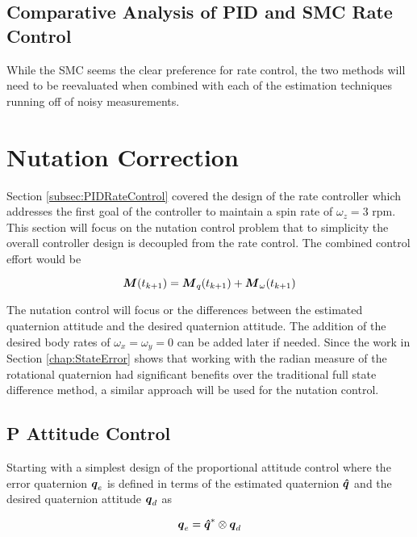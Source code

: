 \subsection{Comparative Analysis of PID and SMC Rate Control}
\label{subsec:ComparativeAnalysisofPIDandSMCRateControl}


While the SMC seems the clear preference for rate control, the two methods will need to be reevaluated when combined with each of the estimation techniques running off of noisy measurements.

\section{Nutation Correction}
\label{sec:NutationCorrection}

Section \ref{subsec:PIDRateControl} covered the design of the rate controller which addresses the first goal of the controller to maintain a spin rate of $\omega_z = 3$ rpm.  This section will focus on the nutation control problem that to simplicity the overall controller design is decoupled from the rate control.  The combined control effort would be

\begin{equation}
    \boldsymbol{M}(t_{k+1}) = \boldsymbol{M}_{q}(t_{k+1}) + \boldsymbol{M}_{\omega}(t_{k+1})
\end{equation}

The nutation control will focus or the differences between the estimated quaternion attitude and the desired quaternion attitude.  The addition of the desired body rates of $\omega_x = \omega_y = 0$ can be added later if needed.  Since the work in Section \ref{chap:StateError} shows that working with the radian measure of the rotational quaternion had significant benefits over the traditional full state difference method, a similar approach will be used for the nutation control.

\subsection{P Attitude Control}
\label{subsec:PAttitudeControl}

Starting with a simplest design of the proportional attitude control where the error quaternion $\boldsymbol{q}_e$ is defined in terms of the estimated quaternion $\boldsymbol{\hat{q}}$ and the desired quaternion attitude $\boldsymbol{q}_d$ as

\begin{equation}
  \boldsymbol{q}_e = \boldsymbol{\hat{q}}^* \otimes \boldsymbol{q}_d
\end{equation}

